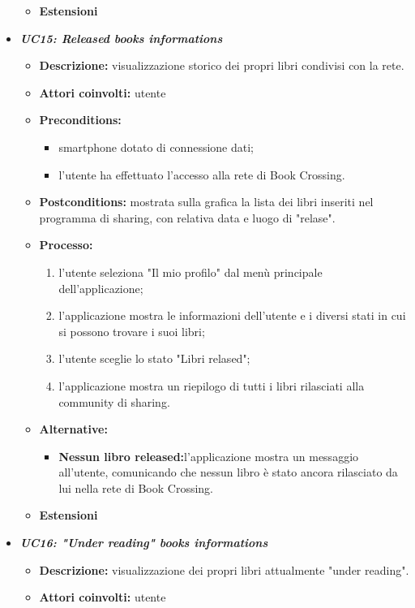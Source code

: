 \begin{itemize}
\begin{itemize}
		\item \textbf{Estensioni}
	\end{itemize}
	\item \textbf{\textit{UC15: Released books informations}}
	\begin{itemize}
		\item \textbf{Descrizione:} visualizzazione storico dei propri libri condivisi con la rete.
		\item \textbf{Attori coinvolti:}  utente
		\item \textbf{Preconditions:}
		\begin{itemize}
			\item smartphone dotato di connessione dati;
			\item l’utente ha effettuato l’accesso alla rete di Book Crossing.
		\end{itemize}
		\item \textbf{Postconditions:} mostrata sulla grafica la lista dei libri inseriti nel programma di sharing, con relativa data e luogo di "relase".
		\item \textbf{Processo:}
		\begin{enumerate}
			\item l'utente seleziona "Il mio profilo" dal menù principale dell'applicazione;
			\item l'applicazione mostra le informazioni dell'utente e i diversi stati in cui si possono trovare i suoi libri;
			\item l'utente sceglie lo stato "Libri relased";
			\item l'applicazione mostra un riepilogo di tutti i libri rilasciati alla community di sharing.
		\end{enumerate}
		\item \textbf{Alternative:}
		\begin{itemize}
			\item \textbf{Nessun libro released:}l'applicazione mostra un messaggio all'utente, comunicando che nessun libro è stato ancora rilasciato da lui nella rete di Book Crossing.
		\end{itemize}
		\item \textbf{Estensioni}
	\end{itemize}
	\item \textbf{\textit{UC16: "Under reading" books informations}}
	\begin{itemize}
		\item \textbf{Descrizione:} visualizzazione dei propri libri attualmente "under reading".
		\item \textbf{Attori coinvolti:} utente

\end{itemize}
\end{itemize}
